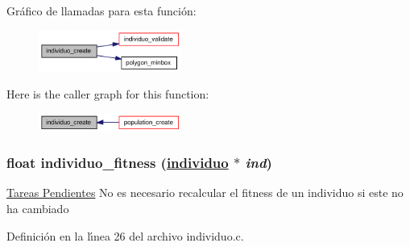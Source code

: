Gr\'{a}fico de llamadas para esta funci\'{o}n:\begin{figure}[H]
\begin{center}
\leavevmode
\includegraphics[width=133pt]{group__genetic_gf4e60223d27c85a5f6166e35ecafe641_gf4e60223d27c85a5f6166e35ecafe641_cgraph}
\end{center}
\end{figure}


Here is the caller graph for this function:\begin{figure}[H]
\begin{center}
\leavevmode
\includegraphics[width=133pt]{group__genetic_gf4e60223d27c85a5f6166e35ecafe641_gf4e60223d27c85a5f6166e35ecafe641_icgraph}
\end{center}
\end{figure}
\hypertarget{group__genetic_gf152bd4602acec2166cc4b91e8c8919a_gf152bd4602acec2166cc4b91e8c8919a}{
\subsubsection[individuo\_\-fitness]{\setlength{\rightskip}{0pt plus 5cm}float individuo\_\-fitness (\hyperlink{struct__individuo}{individuo} $\ast$ {\em ind})}}
\label{group__genetic_gf152bd4602acec2166cc4b91e8c8919a_gf152bd4602acec2166cc4b91e8c8919a}


\begin{Desc}
\item[\hyperlink{todo__todo000002}{Tareas Pendientes}]No es necesario recalcular el fitness de un individuo si este no ha cambiado \end{Desc}


Definici\'{o}n en la l\'{\i}nea 26 del archivo individuo.c.

